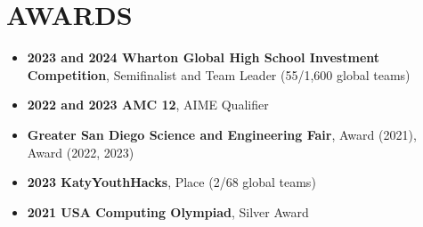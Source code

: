 \section*{AWARDS}
\noindent
\begin{itemize}
	\item \textbf{2023 and 2024 Wharton Global High School Investment Competition}, Semifinalist and Team Leader (55/1,600 global teams)
	\item \textbf{2022 and 2023 AMC 12}, AIME Qualifier
	\item \textbf{Greater San Diego Science and Engineering Fair},  Award (2021),  Award (2022, 2023)
	\item \textbf{2023 KatyYouthHacks},  Place (2/68 global teams)
	\item \textbf{2021 USA Computing Olympiad}, Silver Award
\end{itemize}
